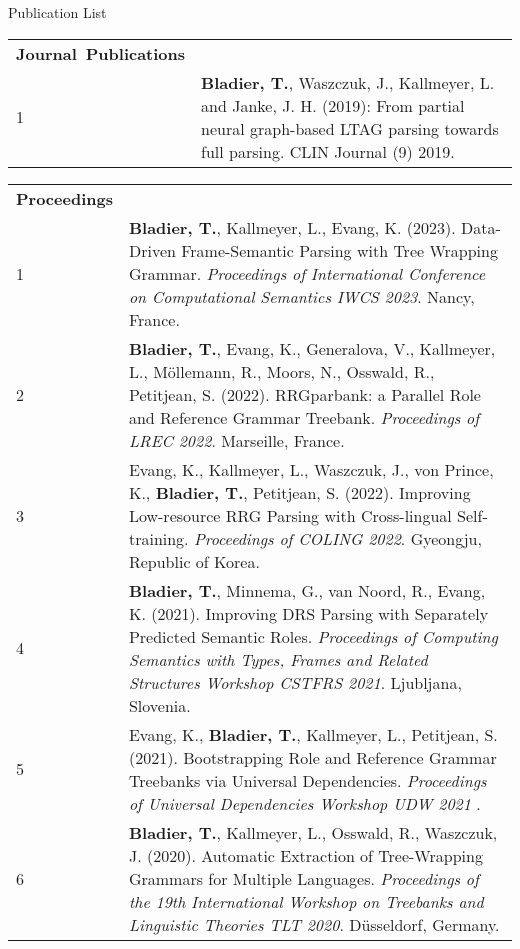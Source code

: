 \documentclass{resume} %
\begin{document}
\bigskip

\begin{rSection}{Publication List}

\begin{tabular}{p{0.1cm}p{17cm}}
{\bf Journal\textcolor{white}{a}Publications} &  \\[10pt]
1 & {\bf Bladier, T.}, Waszczuk, J., Kallmeyer, L. and Janke, J. H. (2019): From partial neural graph-based LTAG parsing towards full parsing. CLIN Journal (9) 2019. \\[20pt]
\end{tabular}
\begin{tabular}{p{0.1cm}p{17cm}}
	{\bf Proceedings} &  \\[10pt]
 1 & {\bf Bladier, T.}, Kallmeyer, L., Evang, K. (2023). Data-Driven Frame-Semantic Parsing with Tree Wrapping Grammar.  {\it Proceedings of International Conference on Computational Semantics IWCS 2023}. Nancy, France. \\[5pt]
 
 2 & {\bf Bladier, T.}, Evang, K., Generalova, V., Kallmeyer, L., M{\"o}llemann, R., Moors, N., Osswald, R., Petitjean, S. (2022).  RRGparbank: a Parallel Role and Reference Grammar Treebank.  {\it  Proceedings of LREC 2022}. Marseille, France. \\[5pt]
 
 3 & Evang, K., Kallmeyer, L., Waszczuk, J., von Prince, K., {\bf Bladier, T.}, Petitjean, S. (2022).  Improving Low-resource RRG Parsing with Cross-lingual Self-training.  {\it  Proceedings of COLING 2022}. Gyeongju, Republic of Korea. \\[5pt]
 
 
 4 & {\bf Bladier, T.}, Minnema, G., van Noord, R., Evang, K. (2021).  Improving DRS Parsing with Separately Predicted Semantic Roles.  {\it  Proceedings of Computing Semantics with Types, Frames and Related Structures Workshop CSTFRS 2021}. Ljubljana, Slovenia. \\[5pt]
  
 5 & Evang, K., {\bf Bladier, T.}, Kallmeyer, L., Petitjean, S. (2021).  Bootstrapping Role and Reference Grammar Treebanks via Universal Dependencies.  {\it  Proceedings of Universal Dependencies Workshop UDW 2021 }. \\[5pt]
 
 6 & {\bf Bladier, T.}, Kallmeyer, L., Osswald, R., Waszczuk, J. (2020). Automatic Extraction of Tree-Wrapping Grammars for Multiple Languages.  {\it Proceedings of the 19th International Workshop on Treebanks and Linguistic Theories TLT 2020}. Düsseldorf, Germany. \\[5pt]
 

\end{tabular}
\end{rSection}
\end{document}
